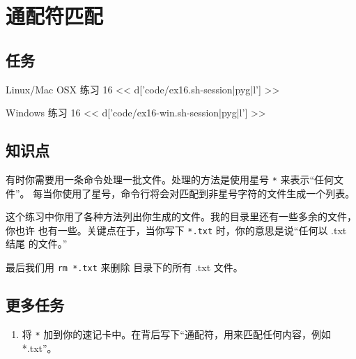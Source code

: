 \chapter{通配符匹配}

\section{任务}

\begin{code}{Linux/Mac OSX 练习 16}
<< d['code/ex16.sh-session|pyg|l'] >>
\end{code}

\begin{code}{Windows 练习 16}
<< d['code/ex16-win.sh-session|pyg|l'] >>
\end{code}

\section{知识点}

有时你需要用一条命令处理一批文件。处理的方法是使用星号 \verb|*| 来表示“任何文件”。
每当你使用了星号，命令行将会对匹配到非星号字符的文件生成一个列表。

这个练习中你用了各种方法列出你生成的文件。我的目录里还有一些多余的文件，你也许
也有一些。关键点在于，当你写下 \verb|*.txt| 时，你的意思是说“任何以 .txt 结尾
的文件。”

最后我们用 \verb|rm *.txt| 来删除  目录下的所有 .txt 文件。

\section{更多任务}

\begin{enumerate}
\item 将 \verb|*| 加到你的速记卡中。在背后写下“通配符，用来匹配任何内容，例如 *.txt”。
\end{enumerate}

